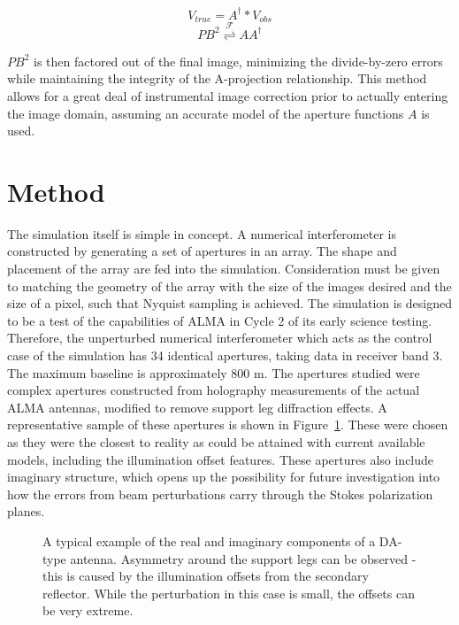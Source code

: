 \documentclass[11pt]{article}
\begin{document}
\begin{equation}
    \label{eq:a-proj-cor}
    V_{true} = A^{\dagger} * V_{obs}
\end{equation}
\begin{equation}
    \label{eq:imcor}
    PB^2 \overset{\mathcal{F}}{\rightleftharpoons} AA^{\dagger}
\end{equation}

$PB^2$ is then factored out of the final image, minimizing the divide-by-zero 
errors while maintaining the integrity of the A-projection relationship. This 
method allows for a great deal of instrumental image correction prior to 
actually entering the image domain, assuming an accurate model of the aperture 
functions $A$ is used.

\section{Method}

The simulation itself is simple in concept.  A numerical interferometer is 
constructed by generating a set of apertures in an array.  The shape and 
placement of the array are fed into the simulation. Consideration must be given 
to matching the geometry of the array with the size of the images desired and 
the size of a pixel, such that Nyquist sampling is achieved.  The simulation is 
designed to be a test of the capabilities of ALMA in Cycle 2 of its early 
science testing. Therefore, the unperturbed numerical interferometer which acts 
as the control case of the simulation has 34 identical apertures, taking data 
in receiver band 3. The maximum baseline is approximately 800 m.
The apertures studied were complex apertures constructed from holography 
measurements of the actual ALMA antennas, modified to remove support leg 
diffraction effects. A representative sample of these apertures is shown in
Figure~\ref{fig:apertures}. These were chosen as they were the closest to 
reality as could be attained with current available models, including the 
illumination offset features. These apertures also include imaginary structure, 
which opens up the possibility for future investigation into how the
errors from beam perturbations carry through the Stokes polarization planes.

\begin{figure}
    \centering
    \quad
    \caption{
        A typical example of the real and imaginary components of a DA-type 
        antenna. Asymmetry around the support legs can be observed - this is 
        caused by the illumination offsets from the secondary reflector. While 
        the perturbation in this case is small, the offsets can be very 
        extreme.  }
    \label{fig:apertures}
\end{figure}
\end{document}
